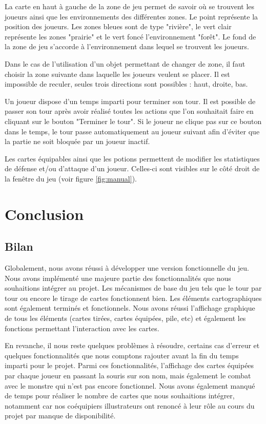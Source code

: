 \documentclass[12pt]{report}
\begin{document}
		La carte en haut à gauche de la zone de jeu permet de savoir où se trouvent les joueurs ainsi que les environnements des différentes zones. Le point représente la position des joueurs. Les zones bleues sont de type "rivière", le vert clair représente les zones "prairie" et le vert foncé l'environnement "forêt". Le fond de la zone de jeu s'accorde à l'environnement dans lequel se trouvent les joueurs.

		Dans le cas de l'utilisation d'un objet permettant de changer de zone, il faut choisir la zone suivante dans laquelle les joueurs veulent se placer. Il est impossible de reculer, seules trois directions sont possibles : haut, droite, bas.

		Un joueur dispose d'un temps imparti pour terminer son tour. Il est possible de passer son tour après avoir réalisé toutes les actions que l'on souhaitait faire en cliquant sur le bouton "Terminer le tour". Si le joueur ne clique pas sur ce bouton dans le temps, le tour passe automatiquement au joueur suivant afin d'éviter que la partie ne soit bloquée par un joueur inactif.

		Les cartes équipables ainsi que les potions permettent de modifier les statistiques de défense et/ou d'attaque d'un joueur. Celles-ci sont visibles sur le côté droit de la fenêtre du jeu (voir figure \ref{fig:manual}).

\chapter*{Conclusion}

  \section*{Bilan}
  Globalement, nous avons réussi à développer une version fonctionnelle du jeu. Nous avons implémenté une majeure partie des fonctionnalités que nous souhaitions intégrer au projet. Les mécanismes de base du jeu tels que le tour par tour ou encore le tirage de cartes fonctionnent bien. Les éléments cartographiques sont également terminés et fonctionnels. Nous avons réussi l'affichage graphique de tous les éléments (cartes tirées, cartes équipées, pile, etc) et également les fonctions permettant l'interaction avec les cartes.

  En revanche, il nous reste quelques problèmes à résoudre, certains cas d'erreur et quelques fonctionnalités que nous comptons rajouter avant la fin du temps imparti pour le projet. Parmi ces fonctionnalités, l'affichage des cartes équipées par chaque joueur en passant la souris sur son nom, mais également le combat avec le monstre qui n'est pas encore fonctionnel. Nous avons également manqué de temps pour réaliser le nombre de cartes que nous souhaitions intégrer, notamment car nos coéquipiers illustrateurs ont renoncé à leur rôle au cours du projet par manque de disponibilité.
\end{document}
